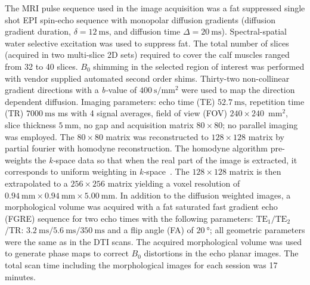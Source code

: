 The MRI pulse sequence used in the image acquisition was a fat suppressed single shot EPI spin-echo sequence with monopolar diffusion gradients (diffusion gradient duration, $\delta = \SI{12}{\milli\second}$, and diffusion time $\Delta = \SI{20}{\milli\second}$). 
Spectral-spatial water selective excitation was used to suppress fat.
The total number of slices (acquired in two multi-slice 2D sets) required to cover the calf muscles ranged from 32 to 40 slices.
$B_0$ shimming in the selected region of interest was performed with vendor supplied automated second order shims.
Thirty-two non-collinear gradient directions with a \mbox{\textit{b-}value} of $\SI{400}{\second \per \milli\meter^2}$ were used to map the direction dependent diffusion.
Imaging parameters: echo time (TE) $\SI{52.7}{\milli\second}$, repetition time (TR) $\SI{7000}{\milli\second}$ ms with 4 signal averages, field of view (FOV) $240 \times 240 \; \SI{}{\milli\meter^2}$, slice thickness $\SI{5}{\milli\meter}$, no gap and acquisition matrix $80 \times 80$; no parallel imaging was employed. The $80 \times 80$ matrix was reconstructed to $128 \times 128$ matrix by partial fourier with homodyne reconstruction.
The homodyne algorithm pre-weights the \mbox{\textit{k-}space} data so that when the real part of the image is extracted, it corresponds to uniform weighting in \mbox{\textit{k-}space}~\cite{RND20}.
The $128 \times 128$ matrix is then extrapolated to a $256 \times 256$ matrix yielding a voxel resolution of $\SI{0.94}{\milli\meter} \times \SI{0.94}{\milli\meter} \times \SI{5.00}{\milli\meter}$.
In addition to the diffusion weighted images, a morphological volume was acquired with a fat saturated fast gradient echo (FGRE) sequence for two echo times with the following parameters: $\mathrm{TE_1}/\mathrm{TE_2}$/TR: $\SI{3.2}{\milli\second}/\SI{5.6}{\milli\second}/\SI{350}{\milli\second}$ and a flip angle (FA) of $\SI{20}{\degree}$; all geometric parameters were the same as in the DTI scans.
The acquired morphological volume was used to generate phase maps to correct $B_0$ distortions in the echo planar images.
The total scan time including the morphological images for each session was 17 minutes. 
